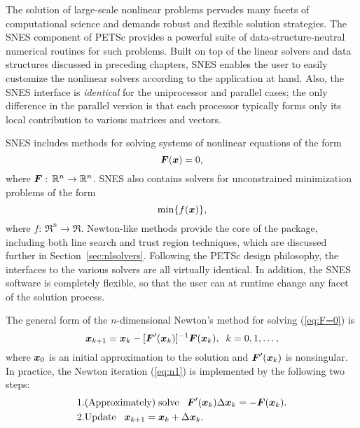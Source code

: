 The solution of large-scale nonlinear problems pervades many facets of
computational science and demands robust and flexible solution
strategies. The SNES component of PETSc provides a powerful suite of
data-structure-neutral numerical routines for such problems.  Built on
top of the linear solvers and data structures discussed in preceding
chapters, SNES enables the user to easily customize the nonlinear
solvers according to the application at hand.  Also, the SNES
interface is {\em identical} for the uniprocessor and parallel cases;
the only difference in the parallel version is that each processor
typically forms only its local contribution to various matrices and
vectors.

SNES includes methods for solving systems of nonlinear equations of the form 
\begin{equation}
\mbox{\boldmath \(F\)}(\mbox{\boldmath \(x\)}) = 0,
\label{eq:F=0}
\end{equation}
where $\mbox{\boldmath \(F\)}: \, \mathbb R^n \rightarrow \mathbb R^n$. SNES also contains solvers for
unconstrained minimization problems of the form
\begin{equation}
{\rm min} \{ f(\mbox{\boldmath \(x\)}) \},
\label{eq:minF}
\end{equation}
where $f: \, \Re^n \rightarrow \Re$.
Newton-like methods provide the core of the package, including
 both line search  
and trust region  techniques, which are discussed
further in Section~\ref{sec:nlsolvers}. Following the
PETSc design philosophy, the interfaces to the various solvers are all
virtually identical. In addition, the SNES software is completely
flexible, so that the user can at runtime change any facet of the
solution process.

The general form of the $n$-dimensional Newton's method for solving
(\ref{eq:F=0}) is
\begin{equation}
     \mbox{\boldmath \(x\)}_{k+1} = \mbox{\boldmath \(x\)}_k - [ \mbox{\boldmath \(F\)}'(\mbox{\boldmath \(x\)}_k)]^{-1} \mbox{\boldmath \(F\)}(\mbox{\boldmath \(x\)}_k), \;\; k=0,1, \ldots, 
\label{eq:n1}
\end{equation}
where $ \mbox{\boldmath \(x\)}_0 $ is an initial approximation to the solution and   
$ \mbox{\boldmath \(F\)}'(\mbox{\boldmath \(x\)}_k) $ is nonsingular.  
In practice, the Newton iteration (\ref{eq:n1}) is implemented by
the following two steps:
\begin{eqnarray}
  1. & {\rm (Approximately) \;solve\;\;\;} \mbox{\boldmath \(F\)}'(\mbox{\boldmath \(x\)}_k) \Delta \mbox{\boldmath \(x\)}_k = -\mbox{\boldmath \(F\)}(\mbox{\boldmath \(x\)}_k).\\
  2. & {\rm Update\;\;\;} \mbox{\boldmath \(x\)}_{k+1} = \mbox{\boldmath \(x\)}_k + \Delta \mbox{\boldmath \(x\)}_k. \hspace{.225in}
\end{eqnarray}

